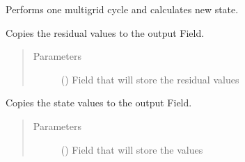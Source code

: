 \documentclass[letterpaper,10pt,english]{sphinxmanual}
\begin{document}
\begin{fulllineitems}
\begin{description}
\begin{description}
\end{description}

\end{description}

\begin{fulllineitems}
\label{\detokenize{autoapi/MultiGrid/index:MultiGrid.MultiGrid.performCycle}}
\sphinxAtStartPar
Performs one multi\sphinxhyphen{}grid cycle and calculates new state.

\end{fulllineitems}


\begin{fulllineitems}
\label{\detokenize{autoapi/MultiGrid/index:MultiGrid.MultiGrid.residuals}}
\sphinxAtStartPar
Copies the residual values to the output Field.
\begin{quote}\begin{description}
\item[{Parameters}] \leavevmode
\sphinxAtStartPar
{} ({\hyperref[\detokenize{autoapi/Field/index:Field.Field}]{}}) \textendash{} Field that will store the residual values

\end{description}\end{quote}

\end{fulllineitems}


\begin{fulllineitems}
\label{\detokenize{autoapi/MultiGrid/index:MultiGrid.MultiGrid.solution}}
\sphinxAtStartPar
Copies the state values to the output Field.
\begin{quote}\begin{description}
\item[{Parameters}] \leavevmode
\sphinxAtStartPar
{} ({\hyperref[\detokenize{autoapi/Field/index:Field.Field}]{}}) \textendash{} Field that will store the values

\end{description}\end{quote}

\end{fulllineitems}


\end{fulllineitems}
\end{document}
